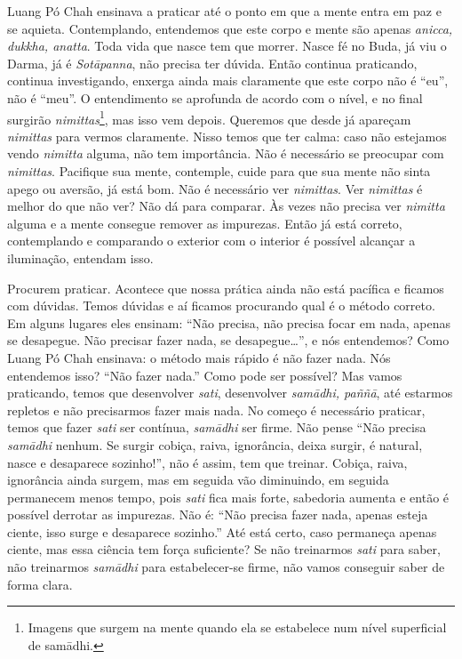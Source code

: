 Luang Pó Chah ensinava a praticar até o ponto em que a mente entra
em paz e se aquieta. Contemplando, entendemos que este corpo e mente
são apenas \textit{anicca, dukkha, anatta}. Toda vida que nasce tem que
morrer. Nasce fé no Buda, já viu o Darma, já é \textit{Sotāpanna},
não precisa ter dúvida. Então continua praticando, continua
investigando, enxerga ainda mais claramente que este corpo não é “eu”,
não é “meu”. O entendimento se aprofunda de acordo com o nível, e no
final surgirão \textit{nimittas}\footnote{Imagens que surgem na mente
quando ela se estabelece num nível superficial de samādhi.}, mas isso
vem depois. Queremos que desde já apareçam \textit{nimittas} para
vermos claramente. Nisso temos que ter calma: caso não estejamos vendo
\textit{nimitta} alguma, não tem importância. Não é necessário se
preocupar com \textit{nimittas}. Pacifique sua mente, contemple, cuide
para que sua mente não sinta apego ou aversão, já está bom. Não é
necessário ver \textit{nimittas}. Ver \textit{nimittas} é melhor do que
não ver? Não dá para comparar. Às vezes não precisa ver
\textit{nimitta} alguma e a mente consegue remover as impurezas. Então
já está correto, contemplando e comparando o exterior com o interior é
possível alcançar a iluminação, entendam isso. 

Procurem praticar. Acontece que nossa prática ainda não está
pacífica e ficamos com dúvidas. Temos dúvidas e aí ficamos procurando
qual é o método correto. Em alguns lugares eles ensinam: “Não precisa,
não precisa focar em nada, apenas se desapegue. Não precisar fazer
nada, se desapegue…”, e nós entendemos? Como Luang Pó Chah ensinava: o
método mais rápido é não fazer nada. Nós entendemos isso? “Não fazer
nada.” Como pode ser possível? Mas vamos praticando, temos que
desenvolver \textit{sati}, desenvolver \textit{samādhi, paññā}, até
estarmos repletos e não precisarmos fazer mais nada. No começo é
necessário praticar, temos que fazer \textit{sati} ser contínua,
\textit{samādhi} ser firme. Não pense “Não precisa \textit{samādhi}
nenhum. Se surgir cobiça, raiva, ignorância, deixa surgir, é natural,
nasce e desaparece sozinho!”, não é assim, tem que treinar. Cobiça,
raiva, ignorância ainda surgem, mas em seguida vão diminuindo, em
seguida permanecem menos tempo, pois \textit{sati} fica mais forte,
sabedoria aumenta e então é possível derrotar as impurezas. Não é: “Não
precisa fazer nada, apenas esteja ciente, isso surge e desaparece
sozinho.” Até está certo, caso permaneça apenas ciente, mas essa
ciência tem força suficiente? Se não treinarmos \textit{sati} para
saber, não treinarmos \textit{samādhi} para estabelecer-se firme, não
vamos conseguir saber de forma clara. 

